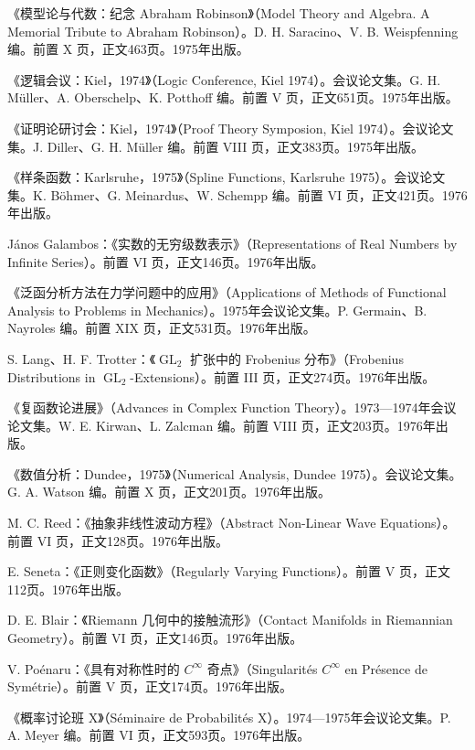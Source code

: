 \begin{description}[style=nextline,leftmargin=1.5em,itemsep=7pt]
\item[第498卷]《模型论与代数：纪念 Abraham Robinson》（Model Theory and Algebra. A Memorial Tribute to Abraham Robinson）。D. H. Saracino、V. B. Weispfenning 编。前置 X 页，正文463页。1975年出版。
\item[第499卷]《逻辑会议：Kiel，1974》（Logic Conference, Kiel 1974）。会议论文集。G. H. Müller、A. Oberschelp、K. Potthoff 编。前置 V 页，正文651页。1975年出版。
\item[第500卷]《证明论研讨会：Kiel，1974》（Proof Theory Symposion, Kiel 1974）。会议论文集。J. Diller、G. H. Müller 编。前置 VIII 页，正文383页。1975年出版。
\item[第501卷]《样条函数：Karlsruhe，1975》（Spline Functions, Karlsruhe 1975）。会议论文集。K. Böhmer、G. Meinardus、W. Schempp 编。前置 VI 页，正文421页。1976年出版。
\item[第502卷] János Galambos：《实数的无穷级数表示》（Representations of Real Numbers by Infinite Series）。前置 VI 页，正文146页。1976年出版。
\item[第503卷]《泛函分析方法在力学问题中的应用》（Applications of Methods of Functional Analysis to Problems in Mechanics）。1975年会议论文集。P. Germain、B. Nayroles 编。前置 XIX 页，正文531页。1976年出版。
\item[第504卷] S. Lang、H. F. Trotter：《$\operatorname{GL}_2$ 扩张中的 Frobenius 分布》（Frobenius Distributions in $\operatorname{GL}_2$-Extensions）。前置 III 页，正文274页。1976年出版。
\item[第505卷]《复函数论进展》（Advances in Complex Function Theory）。1973—1974年会议论文集。W. E. Kirwan、L. Zalcman 编。前置 VIII 页，正文203页。1976年出版。
\item[第506卷]《数值分析：Dundee，1975》（Numerical Analysis, Dundee 1975）。会议论文集。G. A. Watson 编。前置 X 页，正文201页。1976年出版。
\item[第507卷] M. C. Reed：《抽象非线性波动方程》（Abstract Non-Linear Wave Equations）。前置 VI 页，正文128页。1976年出版。
\item[第508卷] E. Seneta：《正则变化函数》（Regularly Varying Functions）。前置 V 页，正文112页。1976年出版。
\item[第509卷] D. E. Blair：《Riemann 几何中的接触流形》（Contact Manifolds in Riemannian Geometry）。前置 VI 页，正文146页。1976年出版。
\item[第510卷] V. Poénaru：《具有对称性时的 $C^\infty$ 奇点》（Singularités $C^\infty$ en Présence de Symétrie）。前置 V 页，正文174页。1976年出版。
\item[第511卷]《概率讨论班 X》（Séminaire de Probabilités X）。1974—1975年会议论文集。P. A. Meyer 编。前置 VI 页，正文593页。1976年出版。

\end{description}
